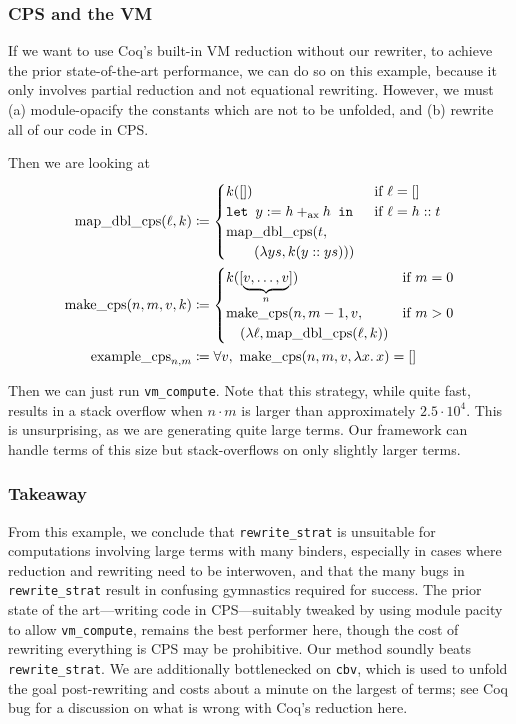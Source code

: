 \begin{subappendices}
\subsubsection{CPS and the VM}
If we want to use Coq's built-in VM reduction without our rewriter, to achieve the prior state-of-the-art performance, we can do so on this example, because it only involves partial reduction and not equational rewriting.
However, we must (a) module-opacify the constants which are not to be unfolded, and (b) rewrite all of our code in CPS.

Then we are looking at
\begin{align*}
    \text{map\_dbl\_cps}(\ell,k) & \defeq \begin{cases} k([]) & \text{if }\ell = [] \\
        \letin[{y := h +_\text{ax} h}{}] & \text{if }\ell = h::t \\
        \text{map\_dbl\_cps}(t, \\
        \qquad(\lambda ys, k(y :: ys)))
    \end{cases} \\
    \text{make\_cps}(n, m, v, k) & \defeq \begin{cases} k([\underbrace{v, \ldots, v}_n]) & \text{if }m = 0 \\
        \text{make\_cps}(n, m-1, v, & \text{if }m > 0 \\
        \quad(\lambda \ell,\text{map\_dbl\_cps}(\ell, k))
    \end{cases} \\
    \text{example\_cps}_{n, m} & \defeq \forall v,\ \text{make\_cps}(n, m, v, \lambda x.\,x) = []
\end{align*}

Then we can just run \texttt{vm\_compute}.
Note that this strategy, while quite fast, results in a stack overflow when $n \cdot m$ is larger than approximately $2.5\cdot 10^4$.
This is unsurprising, as we are generating quite large terms.
Our framework can handle terms of this size but stack-overflows on only slightly larger terms.

\subsubsection{Takeaway}

From this example, we conclude that \texttt{rewrite\_strat} is unsuitable for computations involving large terms with many binders, especially in cases where reduction and rewriting need to be interwoven, and that the many bugs in \texttt{rewrite\_strat} result in confusing gymnastics required for success.
The prior state of the art---writing code in CPS---suitably tweaked by using module pacity to allow \texttt{vm\_compute}, remains the best performer here, though the cost of rewriting everything is CPS may be prohibitive.
Our method soundly beats \texttt{rewrite\_strat}.
We are additionally bottlenecked on \texttt{cbv}, which is used to unfold the goal post-rewriting and costs about a minute on the largest of terms; see Coq bug  for a discussion on what is wrong with Coq's reduction here.



\end{subappendices}
